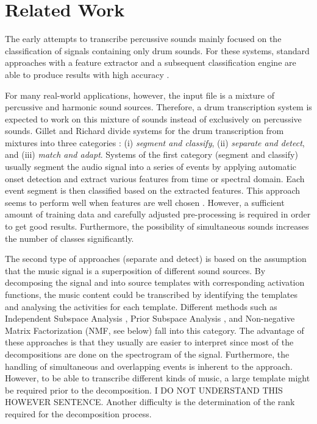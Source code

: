 \documentclass{article}
\begin{document}
\section{Related Work}\label{sec:related works}

The early attempts to transcribe percussive sounds mainly focused on the classification of signals containing only drum sounds. For these systems, standard approaches with a feature extractor and a subsequent classification engine are able to produce results with high accuracy \cite{herrera_automatic_2002, herrera_automatic_2003}. 

For many real-world applications, however, the input file is a mixture of percussive and harmonic sound sources. Therefore, a drum transcription system is expected to work on this mixture of sounds instead of exclusively on percussive sounds. 
Gillet and Richard divide systems for the drum transcription from mixtures into three categories \cite{gillet_transcription_2008}: (i) \textit{segment and classify}, (ii) \textit{separate and detect}, and (iii) \textit{match and adapt}.  Systems of the first category (segment and classify) usually segment the audio signal into a series of events by applying automatic onset detection and extract various features from time or spectral domain. Each event segment is then classified based on the extracted features. 
This approach seems to perform well when features are well chosen \cite{gillet_drumloop_2004, tanghe_algorithm_2005, dittmar_drum_2005}. However, a sufficient amount of training data and carefully adjusted pre-processing is required in order to get good results. Furthermore, the possibility of  simultaneous sounds increases the number of  classes significantly.

The second type of approaches (separate and detect) is based on the assumption that the music signal is a superposition of different sound sources. By decomposing the signal and into source templates with corresponding activation functions, the music content could be transcribed by identifying the templates and analysing the activities for each template. 
Different methods such as Independent Subspace Analysis \cite{fitzgerald_sub-band_2002}, Prior Subspace Analysis \cite{fitzgerald_drum_2003}, and Non-negative Matrix Factorization (NMF, see below) \cite{paulus_drum_2005,moreau_drum_2007,alves_drum_2009} fall into this category. The advantage of these approaches is that they usually are easier to interpret since most of the decompositions are done on the spectrogram of the signal. Furthermore, the handling of simultaneous and overlapping events is inherent to the approach. However, to be able to transcribe different kinds of music, a large template might be required prior to the decomposition. I DO NOT UNDERSTAND THIS HOWEVER SENTENCE. Another difficulty is the determination of the rank required for the decomposition process.
\end{document}

